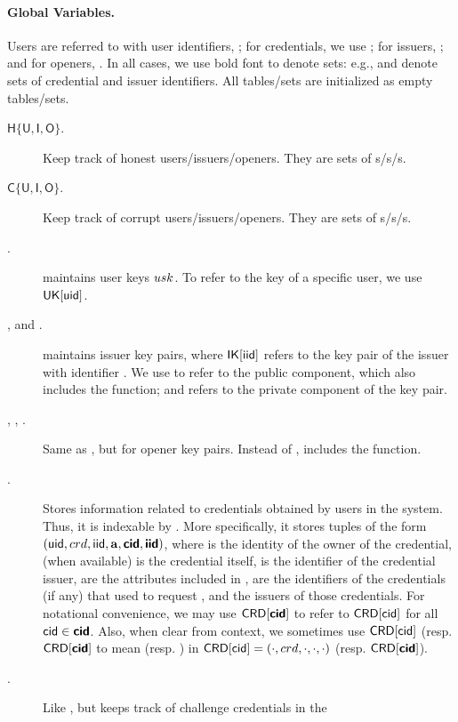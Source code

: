 \paragraph{Global Variables.} %
Users are referred to with user identifiers, \uid; for credentials, we use \cid;
for issuers, \iid; and for openers, \oid. In all cases, we use bold font to
denote sets: e.g., \scid and \siid denote sets of credential and issuer
identifiers. All tables/sets are initialized as empty tables/sets.

\begin{description}
\item[$\mathsf{H}\lbrace\mathsf{U},\mathsf{I},\mathsf{O} \rbrace$.] Keep
  track of honest users/issuers/openers. They are sets of
  {\uid}s/{\iid}s/{\oid}s.
\item[$\mathsf{C}\lbrace\mathsf{U},\mathsf{I},\mathsf{O} \rbrace$.] Keep
  track of corrupt users/issuers/openers. They are sets of
  {\uid}s/{\iid}s/{\oid}s.    
\item[\UK.] \UK maintains user keys $usk$. To refer to the key of a specific
  user, we use $\mathsf{UK}[\mathsf{uid}]$. 
\item[\IK, \PUBIK and \PRVIK.] \IK maintains issuer key pairs, where
  $\mathsf{IK}[\mathsf{iid}]$ refers to the key pair of the issuer with identifier \iid. We
  use \PUBIK to refer to the public component, which also includes the \fissue
  function; and \PRVIK refers to the private component of the key pair.
\item[\OK, \PUBOK, \PRVOK.] Same as \IK, but for opener key pairs. Instead
  of \fissue, \OK includes the \finsp function.
\item[\CRED.] Stores information related to credentials obtained by users in
  the system. Thus, it is indexable by \cid. More specifically, it stores
  tuples of the form $(\mathsf{uid},crd,\mathsf{iid},\mathbf{a},\boldsymbol{\mathsf{cid}},\boldsymbol{\mathsf{\mathsf{iid}}})$, where \uid is the
  identity of the owner of the credential, \cred (when available) is the
  credential itself, \iid is the identifier of the credential issuer, \attrs
  are the attributes included in \cred, \scid are the identifiers of the
  credentials (if any) that \uid used to request \cred, and \siid the issuers
  of those credentials. For notational
  convenience, we may use $\mathsf{CRD}[\boldsymbol{\mathsf{cid}}]$ to refer to $\mathsf{CRD}[\mathsf{cid}]$ for all
  $\mathsf{cid} \in \boldsymbol{\mathsf{cid}}$. Also, when clear from context, we sometimes use
  $\mathsf{CRD}[\mathsf{cid}]$ (resp. $\mathsf{CRD}[\boldsymbol{\mathsf{cid}}]$ to mean \cred (resp. \scred) in
  $\mathsf{CRD}[\mathsf{cid}] = (\cdot,crd,\cdot,\cdot,\cdot)$ (resp. $\mathsf{CRD}[\boldsymbol{\mathsf{cid}}]$).
\item[\CCRED.] Like \CRED, but keeps track of challenge credentials in the

\end{description}
